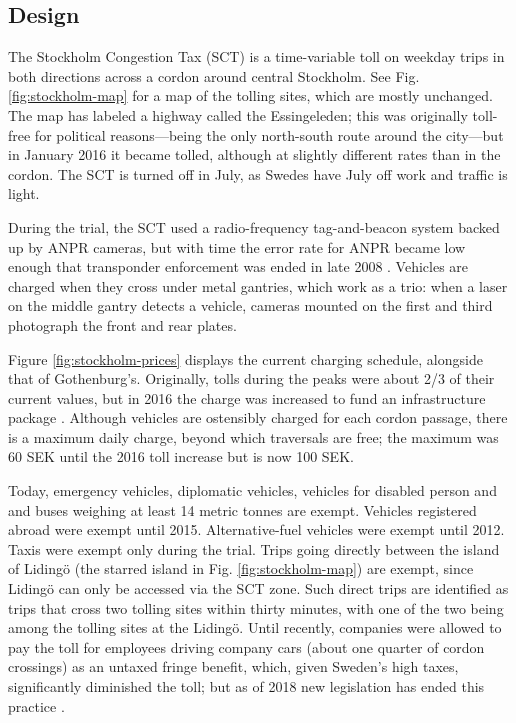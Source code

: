 \subsection{Design}

The Stockholm Congestion Tax (SCT) is a time-variable toll on weekday trips in both directions across a cordon around central Stockholm. See Fig. \ref{fig:stockholm-map} for a map of the tolling sites, which are mostly unchanged. The map has labeled a highway called the Essingeleden; this was originally toll-free for political reasons---being the only north-south route around the city---but in January 2016 it became tolled, although at slightly different rates than in the cordon. The SCT is turned off in July, as Swedes have July off work and traffic is light.

During the trial, the SCT used a radio-frequency tag-and-beacon system backed up by ANPR cameras, but with time the error rate for ANPR became low enough that transponder enforcement was ended in late 2008 \citep[p. 841]{Hamilton2011}. Vehicles are charged when they cross under metal gantries, which work as a trio: when a laser on the middle gantry detects a vehicle, cameras mounted on the first and third photograph the front and rear plates.

Figure \ref{fig:stockholm-prices} displays the current charging schedule, alongside that of Gothenburg's. Originally, tolls during the peaks were about 2/3 of their current values, but in 2016 the charge was increased to fund an infrastructure package \citep{Borjesson2018}. Although vehicles are ostensibly charged for each cordon passage, there is a maximum daily charge, beyond which traversals are free; the maximum was 60 SEK until the 2016 toll increase but is now 100 SEK. 

Today, emergency vehicles, diplomatic vehicles, vehicles for disabled person and and buses weighing at least 14 metric tonnes are exempt. Vehicles registered abroad were exempt until 2015. Alternative-fuel vehicles were exempt until 2012. Taxis were exempt only during the trial. Trips going directly between the island of Liding\"o (the starred island in Fig. \ref{fig:stockholm-map}) are exempt, since Liding\"o can only be accessed via the SCT zone. Such direct trips are identified as trips that cross two tolling sites within thirty minutes, with one of the two being among the tolling sites at the Liding\"o. Until recently, companies were allowed to pay the toll for employees driving company cars (about one quarter of cordon crossings) as an untaxed fringe benefit, which, given Sweden's high taxes, significantly diminished the toll; but as of 2018 new legislation has ended this practice \citep[Sec. 2.2]{Borjesson2018}.

